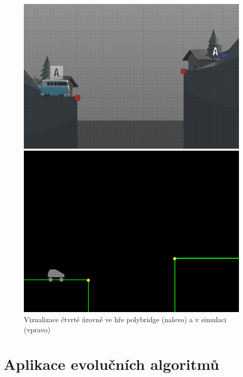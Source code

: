\begin{figure}[ht]
    \centering
    \begin{minipage}{0.49\textwidth}
        \centering
        \includegraphics[width=\linewidth]{img/poly_lvl4.png}
    \end{minipage}\hfill
    \begin{minipage}{0.49\textwidth}
        \centering
        \includegraphics[width=\linewidth]{img/impl_lvl4.png}
    \end{minipage}
    \caption{Vizualizace čtvrté úrovně ve hře polybridge (nalevo) a v simulaci (vpravo)}
    \label{fig:5}
\end{figure}


\section{Aplikace evolučních algoritmů}

